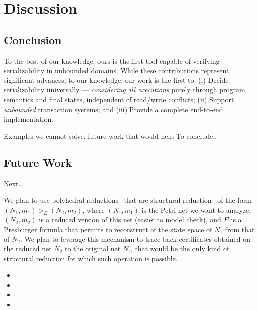 \section{Discussion}
\label{sec:discussion}

\subsection{Conclusion}

To the best of our knowledge, ours is the first 
tool capable of verifying serializability in unbounded domains.
%
While these contributions represent significant advances, to our knowledge, our 
work is the first to:
(i) Decide serializability universally --- \textit{considering all executions} 
purely through program semantics and final states, independent of read/write 
conflicts; 
(ii) Support \textit{unbounded} transaction systems; and
(iii) Provide a complete end-to-end implementation.

Examples we cannot solve, future work that would help
To conclude..


\subsection{Future Work}
Next..

We plan to use polyhedral reductions~\cite{AmBeDa21} that are structural reduction~\cite{Be87,BeLeDa20} of the form $(N_1, m_1) \vartriangleright_E (N_2, m_2)$, where $(N_1, m_1)$ is the Petri net we want to analyze, $(N_2, m_2)$ is a reduced version of this net (easier to model check), and $E$ is a Presburger formula that permits to reconstruct of the state space of $N_1$ from that of $N_2$. We plan to leverage this mechanism to trace back certificates obtained on the reduced net $N_2$ to the original net $N_1$, that would be the only kind of structural reduction for which such operation is possible.

\begin{itemize}
    \item {}
    \item {}
    \item {}
    \item {}
\end{itemize}